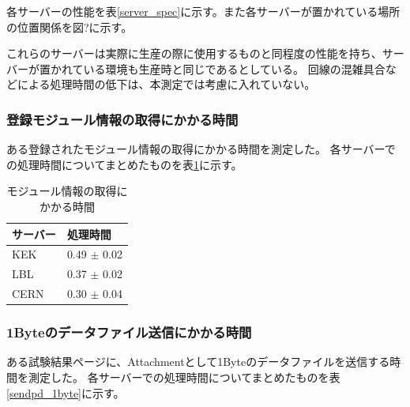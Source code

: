 各サーバーの性能を表\ref{server_spec}に示す。また各サーバーが置かれている場所の位置関係を図?に示す。

\begin{table}[tbp]
\caption[サーバーの性能一覧]{サーバーの性能一覧}
\label{server_spec}
\end{table}

これらのサーバーは実際に生産の際に使用するものと同程度の性能を持ち、サーバーが置かれている環境も生産時と同じであるとしている。
回線の混雑具合などによる処理時間の低下は、本測定では考慮に入れていない。

\subsubsection{登録モジュール情報の取得にかかる時間}
ある登録されたモジュール情報の取得にかかる時間を測定した。
各サーバーでの処理時間についてまとめたものを表\ref{getting_1module}に示す。

\begin{table}[tbp]
\begin{center}
\caption[モジュール情報の取得にかかる時間]{モジュール情報の取得にかかる時間}
\label{getting_1module}
  \begin{tabular}{|ll|} \hline
    サーバー & 処理時間 \\ \hline
    KEK & 0.49 $\pm$ 0.02 \\ 
    LBL & 0.37 $\pm$ 0.02 \\ 
    CERN & 0.30 $\pm$ 0.04 \\ \hline 
  \end{tabular}
\end{center}
\end{table}

\subsubsection{1Byteのデータファイル送信にかかる時間}
ある試験結果ページに、Attachmentとして1Byteのデータファイルを送信する時間を測定した。
各サーバーでの処理時間についてまとめたものを表\ref{sendpd_1byte}に示す。

